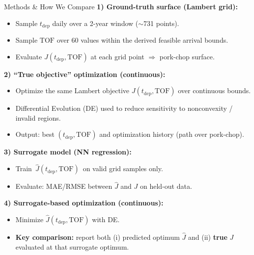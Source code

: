 \documentclass[aspectratio=169]{beamer}
\begin{document}
	\begin{frame}{Methods \& How We Compare}
		\small
		\textbf{1) Ground-truth surface (Lambert grid):}
		\begin{itemize}
			\item Sample $t_{\mathrm{dep}}$ daily over a 2-year window ($\sim$731 points).
			\item Sample $\mathrm{TOF}$ over 60 values within the derived feasible arrival bounds.
			\item Evaluate $J(t_{\mathrm{dep}}, \mathrm{TOF})$ at each grid point $\Rightarrow$ pork-chop surface.
		\end{itemize}
		
		\textbf{2) ``True objective'' optimization (continuous):}
		\begin{itemize}
			\item Optimize the same Lambert objective $J(t_{\mathrm{dep}}, \mathrm{TOF})$ over continuous bounds.
			\item Differential Evolution (DE) used to reduce sensitivity to nonconvexity / invalid regions.
			\item Output: best $(t_{\mathrm{dep}}, \mathrm{TOF})$ and optimization history (path over pork-chop).
		\end{itemize}
		
		\textbf{3) Surrogate model (NN regression):}
		\begin{itemize}
			\item Train $\,\widehat{J}(t_{\mathrm{dep}}, \mathrm{TOF})\,$ on valid grid samples only.
			\item Evaluate: MAE/RMSE between $\widehat{J}$ and $J$ on held-out data.
		\end{itemize}
		
		\textbf{4) Surrogate-based optimization (continuous):}
		\begin{itemize}
			\item Minimize $\widehat{J}(t_{\mathrm{dep}}, \mathrm{TOF})$ with DE.
			\item \textbf{Key comparison:} report both (i) predicted optimum $\widehat{J}$ and (ii) \textbf{true} $J$ evaluated at that surrogate optimum.
		\end{itemize}
	\end{frame}
	
\end{document}
